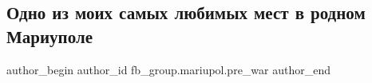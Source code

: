  
 
 
 
 

\subsection{Одно из моих самых любимых мест в родном Мариуполе}
\label{sec:09_02_2023.fb.fb_group.mariupol.pre_war.2.odno_iz_moikh_samikh}

\ifcmt
 author_begin
   author_id fb_group.mariupol.pre_war
 author_end
\fi

